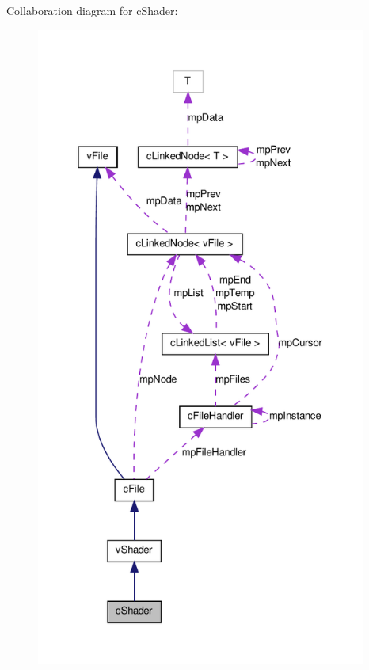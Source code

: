 Collaboration diagram for cShader:
\nopagebreak
\begin{figure}[H]
\begin{center}
\leavevmode
\includegraphics[height=600pt]{classc_shader__coll__graph}
\end{center}
\end{figure}
